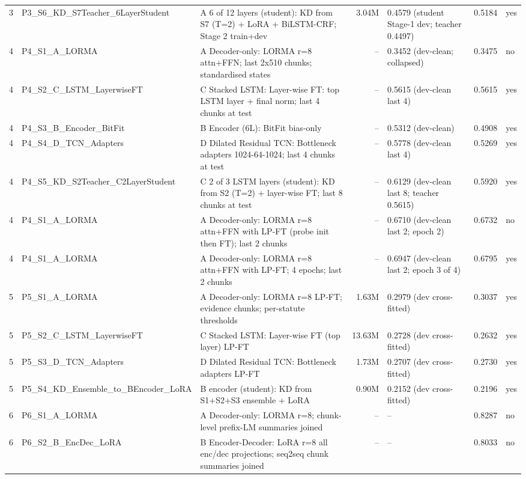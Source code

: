 \begin{longtable}{@{}l p{4.1cm} p{5.2cm} r p{3.0cm} r l@{}}
3 & P3\_S6\_KD\_S7Teacher\_6LayerStudent & A 6 of 12 layers (student): KD from S7 (T=2) + LoRA + BiLSTM-CRF; Stage 2 train+dev & 3.04M & 0.4579 (student Stage-1 dev; teacher 0.4497) & 0.5184 & yes \\
4 & P4\_S1\_A\_LORMA & A Decoder-only: LORMA r=8 attn+FFN; last 2x510 chunks; standardised states & -- & 0.3452 (dev-clean; collapsed) & 0.3475 & no \\
4 & P4\_S2\_C\_LSTM\_LayerwiseFT & C Stacked LSTM: Layer-wise FT: top LSTM layer + final norm; last 4 chunks at test & -- & 0.5615 (dev-clean last 4) & 0.5615 & yes \\
4 & P4\_S3\_B\_Encoder\_BitFit & B Encoder (6L): BitFit bias-only & -- & 0.5312 (dev-clean) & 0.4908 & yes \\
4 & P4\_S4\_D\_TCN\_Adapters & D Dilated Residual TCN: Bottleneck adapters 1024-64-1024; last 4 chunks at test & -- & 0.5778 (dev-clean last 4) & 0.5269 & yes \\
4 & P4\_S5\_KD\_S2Teacher\_C2LayerStudent & C 2 of 3 LSTM layers (student): KD from S2 (T=2) + layer-wise FT; last 8 chunks at test & -- & 0.6129 (dev-clean last 8; teacher 0.5615) & 0.5920 & yes \\
4 & P4\_S1\_A\_LORMA & A Decoder-only: LORMA r=8 attn+FFN with LP-FT (probe init then FT); last 2 chunks & -- & 0.6710 (dev-clean last 2; epoch 2) & 0.6732 & no \\
4 & P4\_S1\_A\_LORMA & A Decoder-only: LORMA r=8 attn+FFN with LP-FT; 4 epochs; last 2 chunks & -- & 0.6947 (dev-clean last 2; epoch 3 of 4) & 0.6795 & yes \\
5 & P5\_S1\_A\_LORMA & A Decoder-only: LORMA r=8 LP-FT; evidence chunks; per-statute thresholds & 1.63M & 0.2979 (dev cross-fitted) & 0.3037 & yes \\
5 & P5\_S2\_C\_LSTM\_LayerwiseFT & C Stacked LSTM: Layer-wise FT (top layer) LP-FT & 13.63M & 0.2728 (dev cross-fitted) & 0.2632 & yes \\
5 & P5\_S3\_D\_TCN\_Adapters & D Dilated Residual TCN: Bottleneck adapters LP-FT & 1.73M & 0.2707 (dev cross-fitted) & 0.2730 & yes \\
5 & P5\_S4\_KD\_Ensemble\_to\_BEncoder\_LoRA & B encoder (student): KD from S1+S2+S3 ensemble + LoRA & 0.90M & 0.2152 (dev cross-fitted) & 0.2196 & yes \\
6 & P6\_S1\_A\_LORMA & A Decoder-only: LORMA r=8; chunk-level prefix-LM summaries joined & -- & -- & 0.8287 & no \\
6 & P6\_S2\_B\_EncDec\_LoRA & B Encoder-Decoder: LoRA r=8 all enc/dec projections; seq2seq chunk summaries joined & -- & -- & 0.8033 & no \\

\end{longtable}
